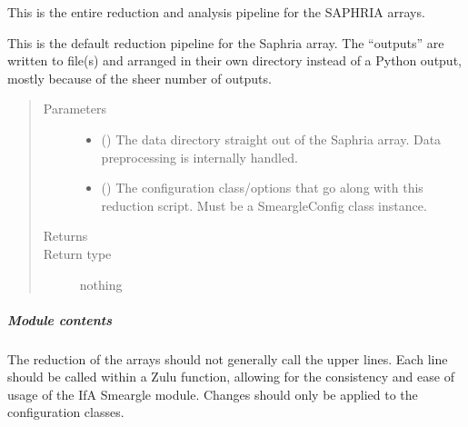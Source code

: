 \documentclass[letterpaper,10pt,english]{sphinxmanual}
\begin{document}
\begin{fulllineitems}
\label{\detokenize{python_docstrings/IfA_Smeargle.zulu.detector_pipelines.saphria_pipeline:IfA_Smeargle.zulu.detector_pipelines.saphria_pipeline.saphria_reduction_pipeline}}
This is the entire reduction and analysis pipeline for the SAPHRIA
arrays.

This is the default reduction pipeline for the Saphria array. The
“outputs” are written to file(s) and arranged in their own directory
instead of a Python output, mostly because of the sheer number of outputs.
\begin{quote}\begin{description}
\item[{Parameters}] \leavevmode\begin{itemize}
\item {} 
 () \textendash{} The data directory straight out of the Saphria array. Data
preprocessing is internally handled.

\item {} 
 () \textendash{} The configuration class/options that go along with this reduction
script. Must be a SmeargleConfig class instance.

\end{itemize}

\item[{Returns}] \leavevmode


\item[{Return type}] \leavevmode
nothing

\end{description}\end{quote}

\end{fulllineitems}



\subparagraph{Module contents}
\label{\detokenize{python_docstrings/IfA_Smeargle.zulu.detector_pipelines:module-IfA_Smeargle.zulu.detector_pipelines}}\label{\detokenize{python_docstrings/IfA_Smeargle.zulu.detector_pipelines:module-contents}}
The reduction of the arrays should not generally call the upper lines.
Each line should be called within a Zulu function, allowing for the
consistency and ease of usage of the IfA Smeargle module. Changes should
only be applied to the configuration classes.
\end{document}
